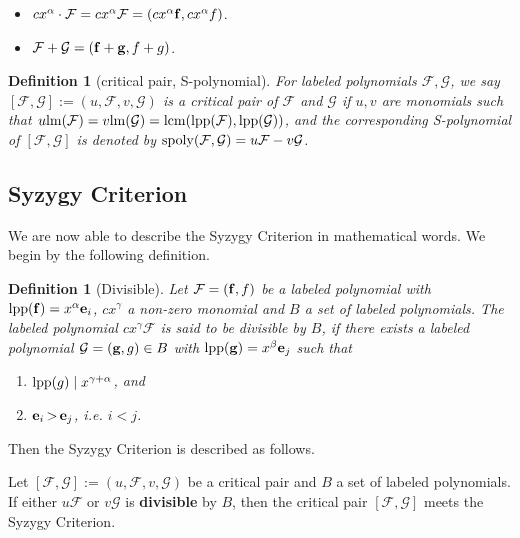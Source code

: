 \documentclass[preprint,authoryear,3p,12pt]{elsarticle}
\newtheorem{define}[theorem]{Definition}
\def\lm{{\rm lm}}
\def\lpp{{\rm lpp}}
\def\fb{{\bf f}}
\def\eb{{\bf e}}
\def\gb{{\bf g}}
\def\lcm{{\rm lcm}}
\def\sp{{\rm spoly}}
\def\sus{{\,>\,}}
\begin{document}
\begin{itemize}
\item   $cx^\alpha   \cdot {\mathcal F}=cx^\alpha{\mathcal F} =(cx^\alpha \fb, cx^\alpha f)$.
\item   ${\mathcal F}+{\mathcal G}=(\fb+\gb, f+g)$.
\end{itemize}

\begin{define}[critical pair, S-polynomial]
 For labeled polynomials ${\mathcal F}, {\mathcal G}$, we say $[{\mathcal F}, {\mathcal G}]:=(u, {\mathcal F}, v, {\mathcal G})$ is a {\em critical pair} of ${\mathcal F}$ and
${\mathcal G}$ if $u, v$ are monomials   such that $u\lm({\mathcal F})=v\lm({\mathcal G})=\lcm(\lpp({\mathcal F}), \lpp({\mathcal
G}))$, and the corresponding {\em S-polynomial} of $[{\mathcal F}, {\mathcal G}]$ is denoted by $\sp({\mathcal F}, {\mathcal
G})=u{\mathcal F}-v{\mathcal G}$.
\end{define}

\subsection{Syzygy Criterion}

We are now able to describe the Syzygy Criterion in mathematical
words. We begin by the following definition.

\begin{define}[Divisible]
Let ${\mathcal F}=(\fb, f)$ be a labeled polynomial with
$\lpp(\fb)=x^\alpha\eb_i$, $cx^\gamma$ a non-zero monomial  and $B
$ a set of labeled polynomials. The labeled polynomial
$cx^\gamma{\mathcal F} $ is said to be divisible by $B$, if there
exists a labeled polynomial ${\mathcal G}=(\gb, g)\in B$ with
$\lpp(\gb)=x^\beta\eb_j$ such that

\begin{enumerate}

\item $\lpp(g) \mid x^{\gamma+\alpha}$, and

\item $\eb_i \sus \eb_j$, i.e. $i<j$.
\end{enumerate}
\end{define}

Then the Syzygy Criterion is described as follows.

\begin{criterion} \caption{\bf --- Syzygy Criterion}
  \smallskip
  \medskip

  \noindent
Let $[{\mathcal F}, {\mathcal G}]:=(u, {\mathcal F}, v, {\mathcal G})$ be a critical pair and $B $ a set of labeled polynomials.
If either $u{\mathcal F}$ or $v{\mathcal G}$ is {\bf divisible} by $B$, then the critical pair $[{\mathcal F}, {\mathcal G}]$
meets the Syzygy Criterion.
  \medskip
\end{criterion}
\end{document}
